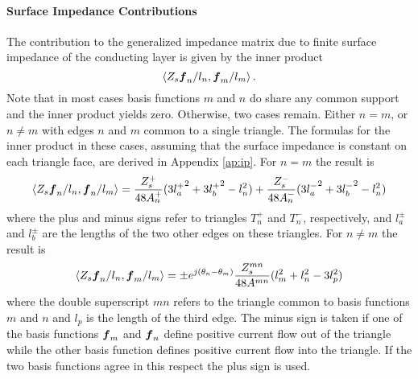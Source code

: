 \paragraph{Surface Impedance Contributions}
The contribution to the generalized impedance matrix due to finite
surface impedance of the conducting layer is given by the inner
product
\begin{equation}
  \left< Z_s \boldsymbol{f}_n/l_n,\boldsymbol{f}_m/l_m \right>.
\end{equation}
Note that in most cases basis functions $m$ and $n$  do share any
common support and the inner product yields zero.  
Otherwise, two cases remain. Either
$n=m$, or $n \neq m$ with edges $n$ and $m$  common to a single
triangle. The formulas for the inner product in these cases, assuming that the 
surface impedance is constant on each triangle face,  
are derived in 
Appendix \ref{ap:ip}.  For $n=m$ the result is
\begin{equation}
\left< Z_s \boldsymbol{f}_n/l_n,\boldsymbol{f}_n/l_m \right> = \frac{Z_s^+}{48A_n^+}(3{l_a^+}^2 + 
                     3{l_b^+}^2 - l_n^2)
            + \frac{Z_s^-}{48A_n^-}(3{l_a^-}^2 + 3{l_b^-}^2 - l_n^2)
\end{equation}
where the plus and minus signs refer to triangles $T_n^+$ and $T_n^-$, 
respectively, and $l_a^{\pm}$ and $l_b^{\pm}$ are the lengths of the 
two other edges on these triangles.  For $n \neq m$ the result is
\begin{equation}
\left< Z_s \boldsymbol{f}_n/l_n,\boldsymbol{f}_m/l_m \right> = \pm
e^{j(\theta_n-\theta_m)}
\frac{Z_s^{mn}}{48A^{mn}}
                    (l_m^2 + l_n^2 - 3 l_{p}^2)
\end{equation}
where the double superscript $mn$ refers to the triangle common 
to basis functions $m$ and 
$n$ and $l_{p}$ is the length of the third edge.  The minus sign is taken if 
one of the basis functions $\boldsymbol{f}_m$ and $\boldsymbol{f}_n$ define positive current flow out 
of the triangle while the other basis function defines positive current flow 
into the triangle.  If the two basis functions agree in this respect the plus 
sign is used.
  
